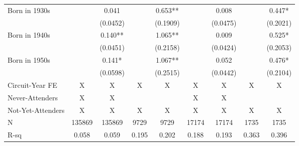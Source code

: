 \begin{center}
{\begin{tabular}{l*{8}{c}}
Born in 1930s       &              &       0.041  &              &       0.653**&              &       0.008  &              &       0.447* \\
                    &              &    (0.0452)  &              &    (0.1909)  &              &    (0.0475)  &              &    (0.2021)  \\

Born in 1940s       &              &       0.140**&              &       1.065**&              &       0.009  &              &       0.525* \\
                    &              &    (0.0451)  &              &    (0.2158)  &              &    (0.0424)  &              &    (0.2053)  \\

Born in 1950s       &              &       0.141* &              &       1.067**&              &       0.052  &              &       0.476* \\
                    &              &    (0.0598)  &              &    (0.2515)  &              &    (0.0442)  &              &    (0.2104)  \\
\cmidrule(lr){1-5} \cmidrule(lr){6-9}
Circuit-Year FE     &           X  &           X  &           X  &           X  &           X  &           X  &           X  &           X  \\
Never-Attenders     &           X  &           X  &              &              &           X  &           X  &              &              \\
Not-Yet-Attenders   &           X  &           X  &           X  &           X  &           X  &           X  &           X  &           X  \\
N                   &      135869  &      135869  &        9729  &        9729  &       17174  &       17174  &        1735  &        1735  \\
R-sq                &       0.058  &       0.059  &       0.195  &       0.202  &       0.188  &       0.193  &       0.363  &       0.396  \\
\bottomrule
\end{tabular}
}
\end{center}

